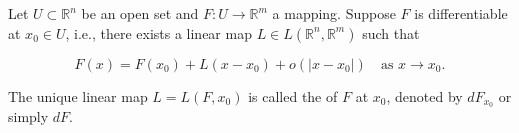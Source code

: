Let $U \subset \mathbb{R}^n$ be an open set and $F: U \to \mathbb{R}^m$ a mapping. Suppose $F$ is differentiable at $x_0 \in U$, i.e., there exists a linear map $L \in L(\mathbb{R}^n, \mathbb{R}^m)$ such that

$$F(x) = F(x_0) + L(x - x_0) + o(|x - x_0|) \quad \text{as } x \to x_0.$$

The unique linear map $L = L(F, x_0)$ is called the  of $F$ at $x_0$, denoted by $dF_{x_0}$ or simply $dF$.
